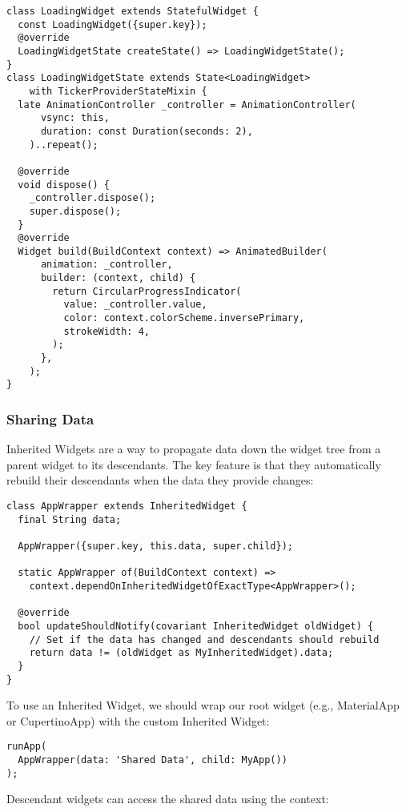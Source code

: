 \begin{lstlisting}
class LoadingWidget extends StatefulWidget {
  const LoadingWidget({super.key});
  @override
  LoadingWidgetState createState() => LoadingWidgetState();
}
class LoadingWidgetState extends State<LoadingWidget> 
    with TickerProviderStateMixin {
  late AnimationController _controller = AnimationController(
      vsync: this,
      duration: const Duration(seconds: 2),
    )..repeat();

  @override
  void dispose() {
    _controller.dispose();
    super.dispose();
  }
  @override
  Widget build(BuildContext context) => AnimatedBuilder(
      animation: _controller,
      builder: (context, child) {
        return CircularProgressIndicator(
          value: _controller.value,
          color: context.colorScheme.inversePrimary,
          strokeWidth: 4,
        );
      },
    );
}
\end{lstlisting}


\subsubsection{Sharing Data}

Inherited Widgets are a way to propagate data down the widget tree from a parent widget to its descendants. The key 
feature is that they automatically rebuild their descendants when the data they provide changes:

\begin{lstlisting}
class AppWrapper extends InheritedWidget {
  final String data;

  AppWrapper({super.key, this.data, super.child});

  static AppWrapper of(BuildContext context) =>
    context.dependOnInheritedWidgetOfExactType<AppWrapper>();

  @override
  bool updateShouldNotify(covariant InheritedWidget oldWidget) {
    // Set if the data has changed and descendants should rebuild
    return data != (oldWidget as MyInheritedWidget).data;
  }
}
\end{lstlisting}

\noindent To use an Inherited Widget, we should wrap our root widget (e.g., MaterialApp or CupertinoApp) with the custom 
Inherited Widget:

\begin{lstlisting}
runApp(
  AppWrapper(data: 'Shared Data', child: MyApp())
);
\end{lstlisting}

\noindent Descendant widgets can access the shared data using the context:

